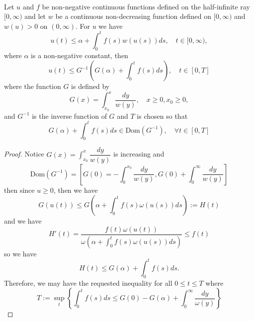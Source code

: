 \begin{proposition}\ \par
    Let $u$ and $f$ be non-negative continuous functions defined on the half-infinite ray $[0,\infty)$ and let $w$ be a continuous non-decreasing function defined on $[0,\infty)$ and $w(u) > 0$ on $(0,\infty)$. For $u$ we have
    \[
    u(t) \leq \alpha + \int_0^t f(s)w(u(s)) ds,\quad t\in[0,\infty),\label{BLIneq}
    \]
    where $\alpha$ is a non-negative constant, then
    \[u(t) \leq G^{-1}\left(G(\alpha)+\int_0^t f(s) ds\right),\quad t\in[0,T]\]
    where the function $G$ is defined by
    \[
    G(x) = \int_{x_0}^x \dfrac{dy}{w(y)},\quad x\geq 0, x_0 \geq 0,
    \]
    and $G^{-1}$ is the inverse function of $G$ and $T$ is chosen so that
    \[
    G(\alpha) + \int_0^t f(s)ds\in\text{Dom}(G^{-1}),\quad \forall t\in[0,T]
    \]
\end{proposition}
\begin{proof}
    Notice $G(x) = \int_{x_0}^x \dfrac{dy}{w(y)}$ is increasing and
    \[
    \text{Dom}(G^{-1}) = \left[G(0)=-\int_{0}^{x_0}\dfrac{dy}{w(y)}, G(0) + \int_0^{\infty}\dfrac{dy}{w(y)}\right]
    \]
    then since $u\geq 0$, then we have
    \[
    G(u(t)) \leq G\left(\alpha + \int_0^t f(s) \omega(u(s))ds\right):=H(t)
    \]
    and we have
    \[
    H'(t) = \dfrac{f(t)\omega(u(t))}{\omega(\alpha+\int_0^t f(s)\omega(u(s))ds)} \leq f(t)
    \]
    so we have
    \[
    H(t) \leq G(\alpha) + \int_0^t f(s)ds.
    \]
    Therefore, we may have the requested inequality for all $0\leq t \leq T$ where
    \[
    T := \sup_{t}\left\{\int_0^tf(s)ds \leq G(0)-G(\alpha)+\int_0^{\infty}\dfrac{dy}{\omega(y)}\right\}
    \]
\end{proof}

